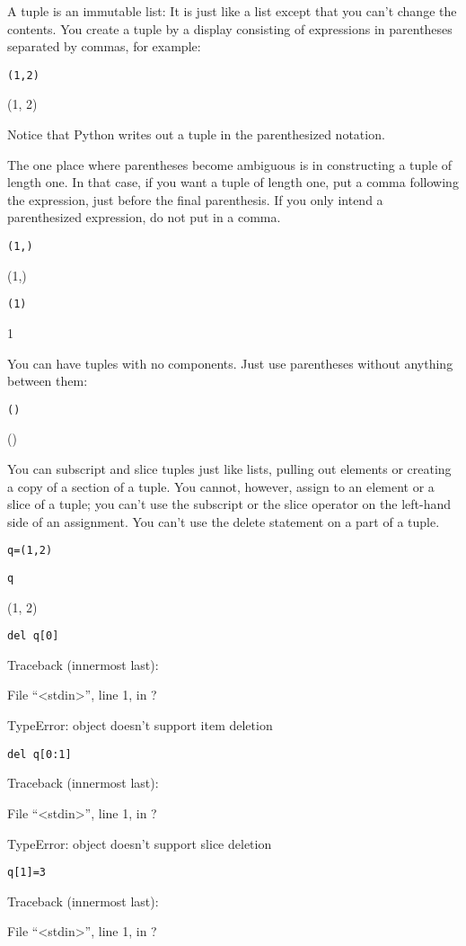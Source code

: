 A tuple is an immutable list: It is
just like a list except that you can't change the contents. You create a
tuple by a display consisting of expressions in parentheses separated by
commas, for example:


\texttt{(1,2)}

(1, 2)

Notice that Python writes out a
tuple in the parenthesized notation.

The one place where parentheses
become ambiguous is in constructing a tuple of length one. In that case,
if you want a tuple of length one, put a comma following the expression,
just before the final parenthesis. If you only intend a parenthesized
expression, do not put in a comma.


\texttt{(1,)}

(1,)


\texttt{(1)}

1

You can have tuples with no
components. Just use parentheses without anything between them:


\texttt{()}

()

You can subscript and slice tuples
just like lists, pulling out elements or creating a copy of a section of
a tuple. You cannot, however, assign to an element or a slice of a
tuple; you can't use the subscript or the slice operator on the
left-hand side of an assignment. You can't use the delete statement on a
part of a tuple.


\texttt{q=(1,2)}


\texttt{q}

(1, 2)


\texttt{del q{[}0{]}}

Traceback (innermost last):

 File
``\textless{}stdin\textgreater{}'', line 1, in ?

TypeError: object doesn't support
item deletion


\texttt{del q{[}0:1{]}}

Traceback (innermost last):

 File
``\textless{}stdin\textgreater{}'', line 1, in ?

TypeError: object doesn't support
slice deletion


\texttt{q{[}1{]}=3}

Traceback (innermost last):

 File
``\textless{}stdin\textgreater{}'', line 1, in ?

